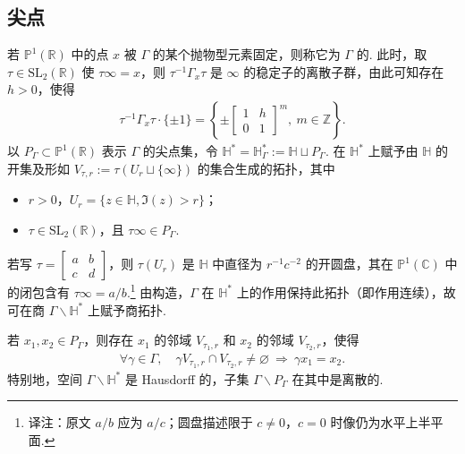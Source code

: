 \subsection{尖点}\label{sec:modular-1-1-4}
若 $\mathbb P^1(\mathbb R)$ 中的点 $x$ 被 $\Gamma$ 的某个抛物型元素固定，则称它为 $\Gamma$ 的. 此时，取 $\tau\in\mathrm{SL}_2(\mathbb R)$ 使 $\tau\infty=x$，则 $\tau^{-1}\Gamma_x\tau$ 是 $\infty$ 的稳定子的离散子群，由此可知存在 $h>0$，使得
\begin{align*}
\tau^{-1}\Gamma_x\tau\cdot\{\pm1\}=\left\{\pm\begin{bmatrix}1&h\\0&1\end{bmatrix}^{m},\ m\in\mathbb Z\right\}.
\end{align*}
以 $P_\Gamma\subset\mathbb P^1(\mathbb R)$ 表示 $\Gamma$ 的尖点集，令 $\mathbb H^*=\mathbb H^*_\Gamma:=\mathbb H\sqcup P_\Gamma$. 在 $\mathbb H^*$ 上赋予由 $\mathbb H$ 的开集及形如 $V_{\tau,r}:=\tau(U_r\sqcup\{\infty\})$ 的集合生成的拓扑，其中
\begin{itemize}
\item $r>0$，$U_r=\{z\in\mathbb H,\Im(z)>r\}$；
\item $\tau\in\mathrm{SL}_2(\mathbb R)$，且 $\tau\infty\in P_\Gamma$.
\end{itemize}
若写 $\tau=\begin{bmatrix}a&b\\c&d\end{bmatrix}$，则 $\tau(U_r)$ 是 $\mathbb H$ 中直径为 $r^{-1}c^{-2}$ 的开圆盘，其在 $\mathbb P^1(\mathbb C)$ 中的闭包含有 $\tau\infty=a/b$.\footnote{译注：原文 $a/b$ 应为 $a/c$；圆盘描述限于 $c\ne0$，$c=0$ 时像仍为水平上半平面.}
由构造，$\Gamma$ 在 $\mathbb H^*$ 上的作用保持此拓扑（即作用连续），故可在商 $\Gamma\backslash\mathbb H^*$ 上赋予商拓扑.
\begin{lemma*}
若 $x_1,x_2\in P_\Gamma$，则存在 $x_1$ 的邻域 $V_{\tau_1,r}$ 和 $x_2$ 的邻域 $V_{\tau_2,r}$，使得
\begin{align*}
\forall\gamma\in\Gamma,\quad \gamma V_{\tau_1,r}\cap V_{\tau_2,r}\ne\varnothing\ \Longrightarrow\ \gamma x_1=x_2.
\end{align*}
特别地，空间 $\Gamma\backslash\mathbb H^*$ 是 Hausdorff 的，子集 $\Gamma\backslash P_\Gamma$ 在其中是离散的.
\end{lemma*}
